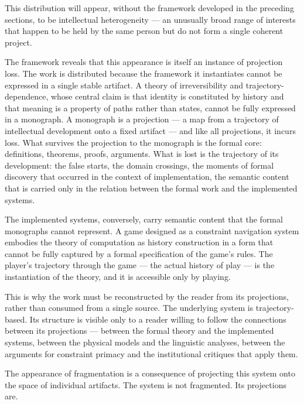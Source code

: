 \documentclass[12pt, twoside]{article}
\theoremstyle{plain}
\theoremstyle{definition}
\theoremstyle{remark}
\begin{document}
This distribution will appear, without the framework developed
in the preceding sections, to be intellectual heterogeneity —
an unusually broad range of interests that happen to be held by
the same person but do not form a single coherent project.

The framework reveals that this appearance is itself an instance
of projection loss.
The work is distributed because the framework it instantiates
cannot be expressed in a single stable artifact.
A theory of irreversibility and trajectory-dependence,
whose central claim is that identity is constituted by history
and that meaning is a property of paths rather than states,
cannot be fully expressed in a monograph.
A monograph is a projection — a map from a trajectory of intellectual
development onto a fixed artifact — and like all projections,
it incurs loss.
What survives the projection to the monograph is the formal core:
definitions, theorems, proofs, arguments.
What is lost is the trajectory of its development:
the false starts, the domain crossings, the moments of formal
discovery that occurred in the context of implementation,
the semantic content that is carried only in the relation
between the formal work and the implemented systems.

The implemented systems, conversely, carry semantic content
that the formal monographs cannot represent.
A game designed as a constraint navigation system embodies
the theory of computation as history construction in a form that
cannot be fully captured by a formal specification of the game's
rules.
The player's trajectory through the game — the actual history of play —
is the instantiation of the theory, and it is accessible only
by playing.

This is why the work must be reconstructed by the reader
from its projections, rather than consumed from a single source.
The underlying system is trajectory-based.
Its structure is visible only to a reader willing to follow the
connections between its projections — between the formal theory
and the implemented systems, between the physical models and
the linguistic analyses, between the arguments for constraint
primacy and the institutional critiques that apply them.

The appearance of fragmentation is a consequence of projecting
this system onto the space of individual artifacts.
The system is not fragmented.
Its projections are.

\newpage

\end{document}
